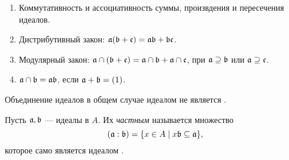     \begin{enumerate}
        \item Коммутативность и ассоциативность суммы, произвдения и пересечения идеалов.
        \item Дистрибутивный закон: $\mathfrak{a}(\mathfrak{b} + \mathfrak{c}) = \mathfrak{ab} + \mathfrak{bc}$.
        \item Модулярный закон: $\mathfrak{a} \cap (\mathfrak{b} + \mathfrak{c}) = \mathfrak{a} \cap \mathfrak{b} + \mathfrak{a} \cap \mathfrak{c}$, при $\mathfrak{a} \supseteq \mathfrak{b}$ или $\mathfrak{a} \supseteq \mathfrak{c}$.
        \item $\mathfrak{a} \cap \mathfrak{b} = \mathfrak{ab}$, если $\mathfrak{a} + \mathfrak{b} = (1)$.
    \end{enumerate}
    Объединение идеалов в общем случае идеалом не является \cite{A-M}.
    \begin{Def}
        Пусть $\mathfrak{a}, \mathfrak{b}$ --- идеалы в $A$. Их \textit{частным} называется множество $$ (\mathfrak{a} : \mathfrak{b}) = \{x \in A \mid x\mathfrak{b} \subseteq \mathfrak{a}\},$$ которое само является идеалом \cite{A-M}.
    \end{Def}

